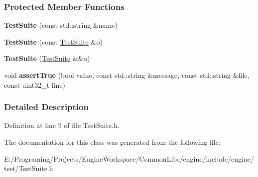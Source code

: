 \subsubsection*{Protected Member Functions}
\begin{DoxyCompactItemize}
\item 
{\bfseries Test\+Suite} (const std\+::string \&name)\hypertarget{a00077_a87f9bfcf72c5c5770860ed6504a72c7b}{}\label{a00077_a87f9bfcf72c5c5770860ed6504a72c7b}

\item 
{\bfseries Test\+Suite} (const \hyperlink{a00077}{Test\+Suite} \&o)\hypertarget{a00077_acacadd979ff275c4c2cd66e4786e5300}{}\label{a00077_acacadd979ff275c4c2cd66e4786e5300}

\item 
{\bfseries Test\+Suite} (\hyperlink{a00077}{Test\+Suite} \&\&o)\hypertarget{a00077_a3b26dd3326cf4e5e9c68807990d61570}{}\label{a00077_a3b26dd3326cf4e5e9c68807990d61570}

\item 
void {\bfseries assert\+True} (bool value, const std\+::string \&message, const std\+::string \&file, const uint32\+\_\+t line)\hypertarget{a00077_ac6deffc64b385afc96461903bcd134c7}{}\label{a00077_ac6deffc64b385afc96461903bcd134c7}

\end{DoxyCompactItemize}


\subsubsection{Detailed Description}


Definition at line 9 of file Test\+Suite.\+h.



The documentation for this class was generated from the following file\+:\begin{DoxyCompactItemize}
\item 
E\+:/\+Programing/\+Projects/\+Engine\+Workspace/\+Common\+Libs/engine/include/engine/test/Test\+Suite.\+h\end{DoxyCompactItemize}
